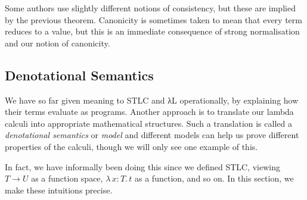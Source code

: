 \documentclass{scrartcl}
\theoremstyle{definition}
\newcommand{\Lam}[2]{λ\,#1.\, #2}
\begin{document}
Some authors use slightly different notions of consistency, but these are implied by the previous theorem.
Canonicity is sometimes taken to mean that every term reduces to a value, but this is an immediate consequence of strong normalisation and our notion of canonicity.

\subsection{Denotational Semantics}

We have so far given meaning to STLC and λL operationally, by explaining how their terms evaluate as programs.
Another approach is to translate our lambda calculi into appropriate mathematical structures.
Such a translation is called a \emph{denotational semantics} or \emph{model} and different models can help us prove different properties of the calculi, though we will only see one example of this.

In fact, we have informally been doing this since we defined STLC, viewing $T → U$ as a function space, $\Lam{x : T}{t}$ as a function, and so on.
In this section, we make these intuitions precise.
\end{document}
